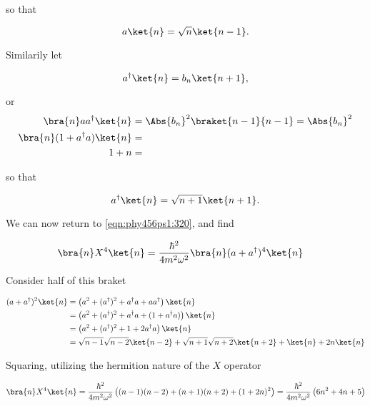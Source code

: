 so that

\begin{equation}\label{eqn:phy456ps1:380}
a \ket{n} = \sqrt{n} \ket{n - 1}.
\end{equation}

Similarily let

\begin{equation}\label{eqn:phy456ps1:400}
a^\dagger \ket{n} = b_n \ket{n + 1},
\end{equation}

or
\begin{align*}
\bra{n} a a^\dagger \ket{n} &= \Abs{b_n}^2 \braket{n - 1}{n-1} = \Abs{b_n}^2 \\
\bra{n} (1 + a^\dagger a) \ket{n} &= \\
1 + n &=
\end{align*}

so that

\begin{equation}\label{eqn:phy456ps1:440}
a^\dagger \ket{n} = \sqrt{n+1} \ket{n + 1}.
\end{equation}

We can now return to \ref{eqn:phy456ps1:320}, and find

\begin{align*}
\bra{n} X^4 \ket{n}
&=
\frac{\hbar^2}{4 m^2 \omega^2} \bra{n} (a + a^\dagger)^4 \ket{n}
\end{align*}

Consider half of this braket

\begin{align*}
(a + a^\dagger)^2 \ket{n}
&=
\left( a^2 + (a^\dagger)^2 + a^\dagger a + a a^\dagger \right) \ket{n} \\
&=
\left( a^2 + (a^\dagger)^2 + a^\dagger a + (1 + a^\dagger a) \right) \ket{n} \\
&=
\left( a^2 + (a^\dagger)^2 + 1 + 2 a^\dagger a \right) \ket{n} \\
&=
\sqrt{n-1}\sqrt{n-2} \ket{n-2}
+
\sqrt{n+1}\sqrt{n+2} \ket{n + 2}
+
\ket{n}
+  2 n \ket{n}
\end{align*}

Squaring, utilizing the hermition nature of the $X$ operator %

\begin{equation}\label{eqn:phy456ps1:500}
\bra{n} X^4 \ket{n}
=
\frac{\hbar^2}{4 m^2 \omega^2}
\left(
(n-1)(n-2) + (n+1)(n+2) + (1 + 2n)^2
\right)
=
\frac{\hbar^2}{4 m^2 \omega^2}
\left( 6 n^2 + 4 n + 5 \right)
\end{equation}

